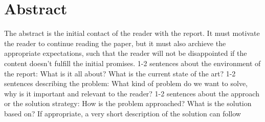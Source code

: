 \chapter*{Abstract}
\label{chapter:abstract}

 	The abstract is the initial contact of the reader with the report. It
 	must motivate the reader to continue reading the paper, but it must
 	also archieve the appropriate expectations, such that the reader will
 	not be disappointed if the content doesn't fulfill the initial
 	promises.
 	1-2 sentences about the environment of the report: What is it
 	  all about? What is the current state of the art?
 	1-2 sentences describing the problem: What kind of problem do we
 	  want to solve, why is it important and relevant to the reader?
 	1-2 sentences about the approach or the solution strategy: How
 	  is the problem approached? What is the solution based on? If
 	  appropriate, a very short description of the solution can follow

